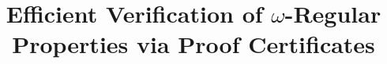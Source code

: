 \documentclass[acmlarge]{acmart}
\begin{document}
\title{Efficient Verification of $\omega$-Regular Properties via Proof Certificates}









\end{document}
